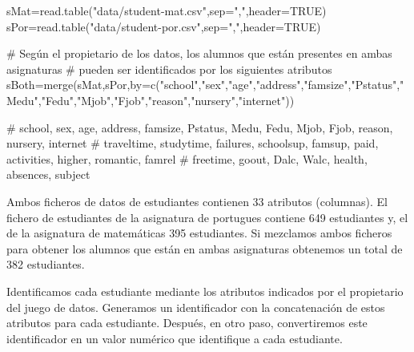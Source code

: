 \documentclass[]{article}
\newenvironment{Shaded}{\begin{snugshade}}{\end{snugshade}}
\newcommand{\CommentTok}[1]{\textcolor[rgb]{0.50,0.62,0.50}{#1}}
\newcommand{\DataTypeTok}[1]{\textcolor[rgb]{0.87,0.87,0.75}{#1}}
\newcommand{\KeywordTok}[1]{\textcolor[rgb]{0.94,0.87,0.69}{#1}}
\newcommand{\NormalTok}[1]{\textcolor[rgb]{0.80,0.80,0.80}{#1}}
\newcommand{\OtherTok}[1]{\textcolor[rgb]{0.94,0.94,0.56}{#1}}
\newcommand{\StringTok}[1]{\textcolor[rgb]{0.80,0.58,0.58}{#1}}
\begin{document}
\begin{Shaded}
\begin{Highlighting}[]
\NormalTok{sMat=}\KeywordTok{read.table}\NormalTok{(}\StringTok{"data/student-mat.csv"}\NormalTok{,}\DataTypeTok{sep=}\StringTok{","}\NormalTok{,}\DataTypeTok{header=}\OtherTok{TRUE}\NormalTok{)}
\NormalTok{sPor=}\KeywordTok{read.table}\NormalTok{(}\StringTok{"data/student-por.csv"}\NormalTok{,}\DataTypeTok{sep=}\StringTok{","}\NormalTok{,}\DataTypeTok{header=}\OtherTok{TRUE}\NormalTok{)}

\CommentTok{# Según el propietario de los datos, los alumnos que están presentes en ambas asignaturas }
\CommentTok{# pueden ser identificados por los siguientes atributos}
\NormalTok{sBoth=}\KeywordTok{merge}\NormalTok{(sMat,sPor,}\DataTypeTok{by=}\KeywordTok{c}\NormalTok{(}\StringTok{"school"}\NormalTok{,}\StringTok{"sex"}\NormalTok{,}\StringTok{"age"}\NormalTok{,}\StringTok{"address"}\NormalTok{,}\StringTok{"famsize"}\NormalTok{,}\StringTok{"Pstatus"}\NormalTok{,}\StringTok{"Medu"}\NormalTok{,}\StringTok{"Fedu"}\NormalTok{,}\StringTok{"Mjob"}\NormalTok{,}\StringTok{"Fjob"}\NormalTok{,}\StringTok{"reason"}\NormalTok{,}\StringTok{"nursery"}\NormalTok{,}\StringTok{"internet"}\NormalTok{))}

\CommentTok{# school, sex, age, address, famsize, Pstatus, Medu, Fedu, Mjob, Fjob, reason, nursery, internet}
\CommentTok{# traveltime, studytime, failures, schoolsup, famsup, paid, activities, higher, romantic, famrel}
\CommentTok{# freetime, goout, Dalc, Walc, health, absences, subject}
\end{Highlighting}
\end{Shaded}

Ambos ficheros de datos de estudiantes contienen 33 atributos
(columnas). El fichero de estudiantes de la asignatura de portugues
contiene 649 estudiantes y, el de la asignatura de matemáticas 395
estudiantes. Si mezclamos ambos ficheros para obtener los alumnos que
están en ambas asignaturas obtenemos un total de 382 estudiantes.

Identificamos cada estudiante mediante los atributos indicados por el
propietario del juego de datos. Generamos un identificador con la
concatenación de estos atributos para cada estudiante. Después, en otro
paso, convertiremos este identificador en un valor numérico que
identifique a cada estudiante.
\end{document}
